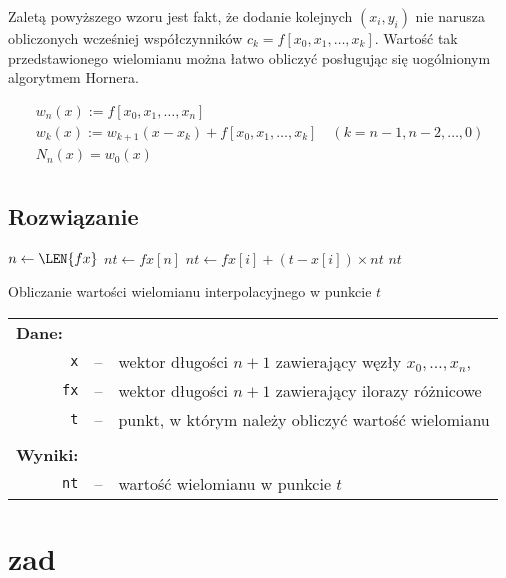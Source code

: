 \documentclass[10pt,a4paper, polish]{article}
\begin{document}
\noindent Zaletą powyższego wzoru jest fakt, że dodanie kolejnych $(x_i, y_i)$ nie narusza obliczonych wcześniej współczynników $c_k=f[x_0,x_1, \ldots, x_k]$.
Wartość tak przedstawionego wielomianu można łatwo obliczyć posługując się uogólnionym algorytmem Hornera.
		
		\begin{align}
		\label{horn}
			&w_n(x) := f[x_0, x_1, \ldots, x_n]& \nonumber \\
			&w_k(x) := w_{k+1}(x-x_k)+ f[x_0, x_1, \ldots, x_k]	\quad(k=n-1, n-2, \ldots, 0)& \nonumber \\
			&N_n(x) = w_0(x) \nonumber \\
		\end{align}

\subsection*{Rozwiązanie}

\begin{algorithm}[h]
				\DontPrintSemicolon
		    	
    			 {
		    		$n \gets \LEN{fx}$\;
		    		$nt \gets fx[n]$\;
		    		 {
		    			$nt \gets fx[i] + (t - x[i]) \times nt$\; 		
		    		}
		    		\KwRet $nt$\;
    			}
    			\caption{Obliczanie wartości wielomianu interpolacyjnego w punkcie $t$}
    			\label{alg:zad2}
		\end{algorithm}			
\begin{longtable}[l]{r  c  l}
\multicolumn{1}{l}{\textbf{Dane:}}&& \\
\texttt{x}&--&wektor długości $n+1$ zawierający węzły $x_0, \ldots, x_n$, \\
\texttt{fx}&--&wektor długości $n+1$ zawierający ilorazy różnicowe \\
\texttt{t}&--&punkt, w którym należy obliczyć wartość wielomianu \\
&& \\
\multicolumn{1}{l}{\textbf{Wyniki:}}&& \\
\texttt{nt}&--&wartość wielomianu w punkcie $t$ \\
\end{longtable}


\section{zad}
\end{document}
